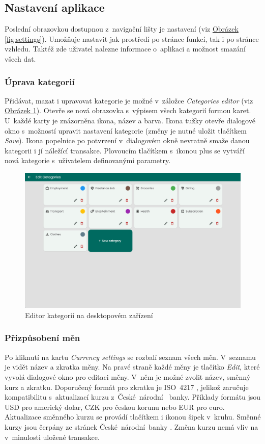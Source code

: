\documentclass[
  biblatex,
  figures=true,
  tables=false,
  glossaries,
  index
]{kidiplom}
\begin{document}
\subsection{Nastavení aplikace}
Poslední obrazovkou dostupnou z~navigační lišty je nastavení (viz \hyperref[fig:settings]{Obrázek \ref{fig:settings}}). Umožňuje nastavit jak prostředí po stránce funkcí, tak i po stránce vzhledu. Taktéž zde uživatel nalezne informace o~aplikaci a možnost smazání všech dat.

\subsubsection{Úprava kategorií}
Přidávat, mazat i upravovat kategorie je možné v~záložce \textit{Categories editor} (viz \hyperref[fig:categories-editor]{Obrázek \ref{fig:categories-editor}}). Otevře se nová obrazovka s~výpisem všech kategorií formou karet. U~každé karty je znázorněna ikona, název a barva. Ikona tužky otevře dialogové okno s~možností upravit nastavení kategorie (změny je nutné uložit tlačítkem \textit{Save}). Ikona popelnice po potvrzení v~dialogovém okně nevratně smaže danou kategorii i jí náležící transakce. Plovoucím tlačítkem s~ikonou plus se vytváří nová kategorie s~uživatelem definovanými parametry.

\begin{figure}
  \centering
  \includegraphics[width=\textwidth]{images/categories-editor-large.png}
  \caption{Editor kategorií na desktopovém zařízení}
  \label{fig:categories-editor}
\end{figure}

\subsubsection{Přizpůsobení měn}
Po kliknutí na kartu \textit{Currency settings} se rozbalí seznam všech měn. V~seznamu je vidět název a zkratka měny. Na pravé straně každé měny je tlačítko \textit{Edit}, které vyvolá dialogové okno pro editaci měny. V~něm je možné zvolit název, směnný kurz a zkratku. Doporučený formát pro zkratku je  ISO~4217 \cite{iso4217}, jelikož zaručuje kompatibilitu s~aktualizací kurzu z~České~národní ~banky. Příklady formátu jsou USD pro americký dolar, CZK pro českou korunu nebo EUR pro euro. Aktualizace směnného kurzu se provádí tlačítkem i ikonou šipek v~kruhu. Směnné kurzy jsou čerpány ze stránek České~národní~banky \cite{cnb-kurzy}. Změna kurzu nemá vliv na v~minulosti uložené transakce.
\end{document}
